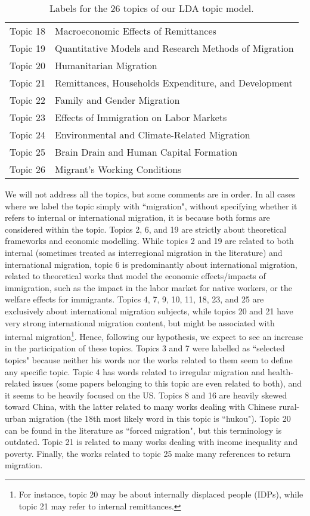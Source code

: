 \begin{table}[]
\begin{tabular}{@{}cl@{}}
Topic 18        & Macroeconomic Effects of Remittances                     \\
Topic 19        & Quantitative Models and Research Methods of Migration    \\
Topic 20        & Humanitarian Migration                                   \\
Topic 21        & Remittances, Households Expenditure, and Development     \\
Topic 22        & Family and Gender Migration                              \\
Topic 23        & Effects of Immigration on Labor Markets                  \\
Topic 24        & Environmental and Climate-Related Migration              \\
Topic 25        & Brain Drain and Human Capital Formation                  \\
Topic 26        & Migrant's Working Conditions                             \\ \bottomrule
\end{tabular}
\caption{Labels for the 26 topics of our LDA topic model.}
\label{tab:topics_labels}
\end{table}

We will not address all the topics, but some comments are in order. In all cases where we label the topic simply with ``migration", without specifying whether it refers to internal or international migration, it is because both forms are considered within the topic. Topics 2, 6, and 19 are strictly about theoretical frameworks and economic modelling. While topics 2 and 19 are related to both internal (sometimes treated as interregional migration in the literature) and international migration, topic 6 is predominantly about international migration, related to theoretical works that model the economic effects/impacts of immigration, such as the impact in the labor market for native workers, or the welfare effects for immigrants. Topics 4, 7, 9, 10, 11, 18, 23, and 25 are exclusively about international migration subjects, while topics 20 and 21 have very strong international migration content, but might be associated with internal migration\footnote{For instance, topic 20 may be about internally displaced people (IDPs), while topic 21 may refer to internal remittances.}. Hence, following our hypothesis, we expect to see an increase in the participation of these topics. Topics 3 and 7 were labelled as ``selected topics" because neither his words nor the works related to them seem to define any specific topic. Topic 4 has words related to irregular migration and health-related issues (some papers belonging to this topic are even related to both), and it seems to be heavily focused on the US. Topics 8 and 16 are heavily skewed toward China, with the latter related to many works dealing with Chinese rural-urban migration (the 18th most likely word in this topic is ``hukou"). Topic 20 can be found in the literature as ``forced migration", but this terminology is outdated. Topic 21 is related to many works dealing with income inequality and poverty. Finally, the works related to topic 25 make many references to return migration.

